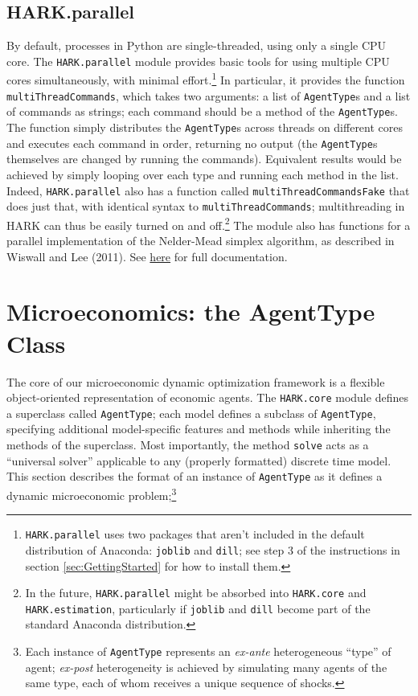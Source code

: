 \documentclass[12pt,titlepage,letterpaper]{econtex}
\begin{document}
{\subsection{HARK.parallel}\label{sec:HARKparallel}

By default, processes in Python are single-threaded, using only a single CPU core.  The \texttt{HARK.parallel} module provides basic tools for using multiple CPU cores simultaneously, with minimal effort.\footnote{\texttt{HARK.parallel} uses two packages that aren't included in the default distribution of Anaconda: \texttt{joblib} and \texttt{dill}; see step 3 of the instructions in section \ref{sec:GettingStarted} for how to install them.}  In particular, it provides the function \texttt{multiThreadCommands}, which takes two arguments: a list of \texttt{AgentType}s and a list of commands as strings; each command should be a method of the \texttt{AgentType}s.  The function simply distributes the \texttt{AgentType}s across threads on different cores and executes each command in order, returning no output (the \texttt{AgentType}s themselves are changed by running the commands).  Equivalent results would be achieved by simply looping over each type and running each method in the list.  Indeed, \texttt{HARK.parallel} also has a function called \texttt{multiThreadCommandsFake} that does just that, with identical syntax to \texttt{multiThreadCommands}; multithreading in HARK can thus be easily turned on and off.\footnote{In the future, \texttt{HARK.parallel} might be absorbed into \texttt{HARK.core} and \texttt{HARK.estimation}, particularly if \texttt{joblib} and \texttt{dill} become part of the standard Anaconda distribution.}  The module also has functions for a parallel implementation of the Nelder-Mead simplex algorithm, as described in Wiswall and Lee (2011). See \href{https://econ-ark.github.io/HARK/generated/HARK.parallel.html}{here} for full documentation.

\section{Microeconomics: the AgentType Class}\label{sec:Microeconomics}

The core of our microeconomic dynamic optimization framework is a flexible object-oriented representation of economic agents.  The \texttt{HARK.core} module defines a superclass called \texttt{AgentType}; each model defines a subclass of \texttt{AgentType}, specifying additional model-specific features and methods while inheriting the methods of the superclass.  Most importantly, the method \texttt{solve} acts as a ``universal solver'' applicable to any (properly formatted) discrete time model.  This section describes the format of an instance of \texttt{AgentType} as it defines a dynamic microeconomic problem;\footnote{Each instance of \texttt{AgentType} represents an \textit{ex-ante} heterogeneous ``type'' of agent; \textit{ex-post} heterogeneity is achieved by simulating many agents of the same type, each of whom receives a unique sequence of shocks.}

}
\end{document}
